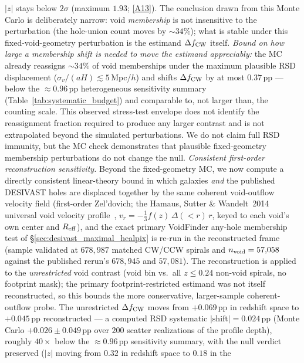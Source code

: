 \documentclass[aps,prd,twocolumn,superscriptaddress,showpacs,preprintnumbers,nofootinbib,longbibliography,floatfix]{revtex4-2}
\newcommand{\repoBase}{https://github.com/Hubify-Projects/bigbounce/blob/main}
\begin{document}
$|z|$ stays below $2\sigma$ (maximum $1.93$;
\href{\repoBase/pipelines/p5\_desi\_chirality/outputs/26\_r27conf\_ess\_recomputes.json}{[A13]}).
The conclusion drawn from this Monte Carlo is deliberately narrow:
void \emph{membership} is not insensitive to the perturbation (the
hole-union count moves by ${\sim}34\%$); what is stable under this
fixed-void-geometry perturbation is the estimand $\Delta f_{\rm CW}$
itself. \emph{Bound on how large a membership shift is needed to move the
estimand appreciably:} the MC already reassigns ${\sim}34\%$ of
void memberships under the maximum plausible RSD displacement
($\sigma_v/(aH)\!\lesssim\!5$\,Mpc/$h$) and shifts $\Delta f_{\rm CW}$
by at most $0.37$\,pp --- below the
${\approx}0.96$\,pp heterogeneous sensitivity summary
(Table~\ref{tab:systematic_budget}) and comparable to, not larger than,
the counting scale. This observed stress-test envelope does not identify
the reassignment fraction required to produce any larger contrast and is
not extrapolated beyond the simulated perturbations. We do not claim full RSD immunity,
but the MC check demonstrates that plausible fixed-geometry membership
perturbations do not change the null. \emph{Consistent first-order
reconstruction sensitivity.} Beyond the
fixed-geometry MC, we now compute a directly consistent linear-theory
bound in which galaxies \emph{and} the published DESIVAST holes are
displaced together by the same coherent void-outflow velocity field
(first-order Zel'dovich; the Hamaus, Sutter \& Wandelt~2014
universal void velocity profile~\cite{Hamaus2014},
$v_r = -\tfrac{1}{3}f(z)\,\Delta(<r)\,r$, keyed to each void's own
center and $R_{\rm eff}$), and the exact primary VoidFinder any-hole
membership test of \S\ref{sec:desivast_maximal_healpix} is re-run in the
reconstructed frame (sample validated at $678{,}987$ matched CW/CCW
spirals and $n_{\rm void}=57{,}058$ against the published rerun's
$678{,}945$ and $57{,}081$). The reconstruction is applied to the
\emph{unrestricted} void contrast (void bin vs.\ all $z\le0.24$ non-void
spirals, no footprint mask); the primary footprint-restricted estimand
was not itself reconstructed, so this bounds the more conservative,
larger-sample coherent-outflow probe. The unrestricted
$\Delta f_{\rm CW}$ moves from $+0.069$\,pp in redshift space to
$+0.045$\,pp reconstructed --- a computed RSD systematic
$|\text{shift}| = 0.024$\,pp (Monte Carlo $+0.026 \pm 0.049$\,pp over
$200$ scatter realizations of the profile depth), roughly $40\times$
below the ${\approx}0.96$\,pp sensitivity summary, with the null verdict
preserved ($|z|$ moving from $0.32$ in redshift space to $0.18$ in the
\end{document}
